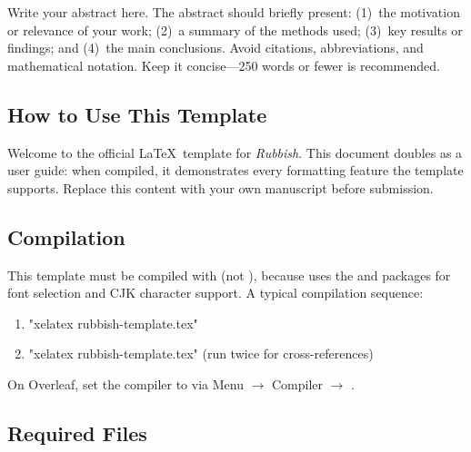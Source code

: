 \documentclass{rubbish}
\begin{document}
\makerubbishtitle

\begin{rubbishabstract}
  Write your abstract here. The abstract should briefly present: (1)~the
  motivation or relevance of your work; (2)~a summary of the methods used;
  (3)~key results or findings; and (4)~the main conclusions. Avoid citations,
  abbreviations, and mathematical notation. Keep it concise---250 words or
  fewer is recommended.
\end{rubbishabstract}

\begin{rubbishbody}

\section{How to Use This Template}

Welcome to the official \LaTeX\ template for \textit{Rubbish}. This
document doubles as a user guide: when compiled, it demonstrates every
formatting feature the template supports. Replace this content with your
own manuscript before submission.

\subsection{Compilation}

This template must be compiled with \textbf{}
(not ),
because  uses the  and
 packages for font selection and CJK character support.
A typical compilation sequence:

\begin{enumerate}[leftmargin=*, itemsep=2pt]
  \item "xelatex rubbish-template.tex"
  \item "xelatex rubbish-template.tex" \quad (run twice for
        cross-references)
\end{enumerate}

\noindent On Overleaf, set the compiler to \textbf{} via
Menu $\to$ Compiler $\to$ .

\subsection{Required Files}


\end{rubbishbody}
\end{document}
